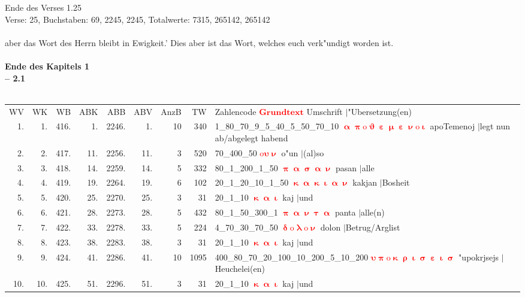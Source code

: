\documentclass[a4paper,10pt,landscape]{article}
\begin{document}
Ende des Verses 1.25\\
Verse: 25, Buchstaben: 69, 2245, 2245, Totalwerte: 7315, 265142, 265142\\
\\
aber das Wort des Herrn bleibt in Ewigkeit.' Dies aber ist das Wort, welches euch verk"undigt worden ist.\\
\\
{\bf Ende des Kapitels 1}\\
\newpage 
{\bf -- 2.1}\\
\medskip \\
\begin{tabular}{rrrrrrrrp{120mm}}
WV&WK&WB&ABK&ABB&ABV&AnzB&TW&Zahlencode \textcolor{red}{$\boldsymbol{Grundtext}$} Umschrift $|$"Ubersetzung(en)\\
1.&1.&416.&1.&2246.&1.&10&340&1\_80\_70\_9\_5\_40\_5\_50\_70\_10 \textcolor{red}{$\boldsymbol{\upalpha\uppi\mathrm{o}\upvartheta\upepsilon\upmu\upepsilon\upnu\mathrm{o}\upiota}$} apoTemenoj $|$legt nun ab/abgelegt habend\\
2.&2.&417.&11.&2256.&11.&3&520&70\_400\_50 \textcolor{red}{$\boldsymbol{\mathrm{o}\upsilon\upnu}$} o"un $|$(al)so\\
3.&3.&418.&14.&2259.&14.&5&332&80\_1\_200\_1\_50 \textcolor{red}{$\boldsymbol{\uppi\upalpha\upsigma\upalpha\upnu}$} pasan $|$alle\\
4.&4.&419.&19.&2264.&19.&6&102&20\_1\_20\_10\_1\_50 \textcolor{red}{$\boldsymbol{\upkappa\upalpha\upkappa\upiota\upalpha\upnu}$} kakjan $|$Bosheit\\
5.&5.&420.&25.&2270.&25.&3&31&20\_1\_10 \textcolor{red}{$\boldsymbol{\upkappa\upalpha\upiota}$} kaj $|$und\\
6.&6.&421.&28.&2273.&28.&5&432&80\_1\_50\_300\_1 \textcolor{red}{$\boldsymbol{\uppi\upalpha\upnu\uptau\upalpha}$} panta $|$alle(n)\\
7.&7.&422.&33.&2278.&33.&5&224&4\_70\_30\_70\_50 \textcolor{red}{$\boldsymbol{\updelta\mathrm{o}\uplambda\mathrm{o}\upnu}$} dolon $|$Betrug/Arglist\\
8.&8.&423.&38.&2283.&38.&3&31&20\_1\_10 \textcolor{red}{$\boldsymbol{\upkappa\upalpha\upiota}$} kaj $|$und\\
9.&9.&424.&41.&2286.&41.&10&1095&400\_80\_70\_20\_100\_10\_200\_5\_10\_200 \textcolor{red}{$\boldsymbol{\upsilon\uppi\mathrm{o}\upkappa\uprho\upiota\upsigma\upepsilon\upiota\upsigma}$} "upokrjsejs $|$Heuchelei(en)\\
10.&10.&425.&51.&2296.&51.&3&31&20\_1\_10 \textcolor{red}{$\boldsymbol{\upkappa\upalpha\upiota}$} kaj $|$und\\

\end{tabular}
\end{document}
